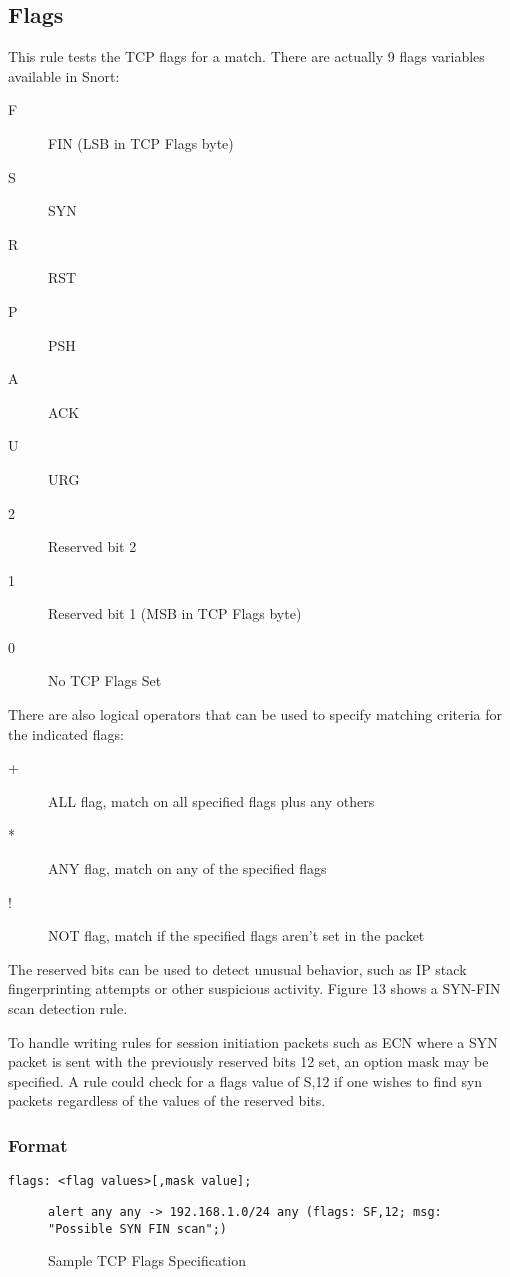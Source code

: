 \documentclass[english]{report}
\begin{document}
\subsection{Flags}

This rule tests the TCP flags for a match. There are actually 9 flags
variables available in Snort: 

\begin{description}
\item [F]FIN (LSB in TCP Flags byte)
\item [S]SYN 
\item [R]RST 
\item [P]PSH 
\item [A]ACK 
\item [U]URG 
\item [2]Reserved bit 2 
\item [1]Reserved bit 1 (MSB in TCP Flags byte)
\item [0]No TCP Flags Set
\end{description}
There are also logical operators that can be used to specify matching
criteria for the indicated flags: 

\begin{description}
\item [+]ALL flag, match on all specified flags plus any others
\item [{*}]ANY flag, match on any of the specified flags
\item [!]NOT flag, match if the specified flags aren't set in the packet
\end{description}
The reserved bits can be used to detect unusual behavior, such as
IP stack fingerprinting attempts or other suspicious activity. Figure
13 shows a SYN-FIN scan detection rule.

To handle writing rules for session initiation packets such as ECN
where a SYN packet is sent with the previously reserved bits 12 set,
an option mask may be specified. A rule could check for a flags value
of S,12 if one wishes to find syn packets regardless of the values
of the reserved bits.


\subsubsection{Format}

\begin{verbatim}
flags: <flag values>[,mask value];
\end{verbatim}
%
\begin{figure}[!hbpt]
\begin{verbatim}
alert any any -> 192.168.1.0/24 any (flags: SF,12; msg: "Possible SYN FIN scan";)
\end{verbatim}

\caption{\label{sample tcp flag}Sample TCP Flags Specification}
\end{figure}
\end{document}
